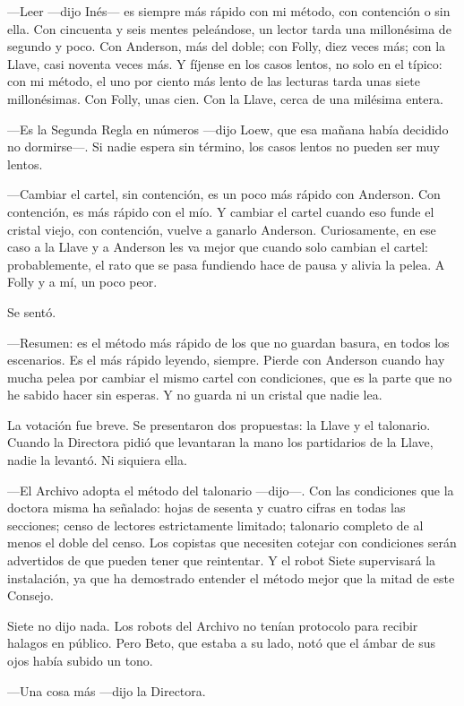 ---Leer ---dijo Inés--- es siempre más rápido con mi método, con contención o sin ella. Con cincuenta y seis mentes peleándose, un lector tarda una millonésima de segundo y poco. Con Anderson, más del doble; con Folly, diez veces más; con la Llave, casi noventa veces más. Y fíjense en los casos lentos, no solo en el típico: con mi método, el uno por ciento más lento de las lecturas tarda unas siete millonésimas. Con Folly, unas cien. Con la Llave, cerca de una milésima entera.

---Es la Segunda Regla en números ---dijo Loew, que esa mañana había decidido no dormirse---\nobreak. Si nadie espera sin término, los casos lentos no pueden ser muy lentos.

---Cambiar el cartel, sin contención, es un poco más rápido con Anderson. Con contención, es más rápido con el mío. Y cambiar el cartel cuando eso funde el cristal viejo, con contención, vuelve a ganarlo Anderson. Curiosamente, en ese caso a la Llave y a Anderson les va mejor que cuando solo cambian el cartel: probablemente, el rato que se pasa fundiendo hace de pausa y alivia la pelea. A Folly y a mí, un poco peor.

Se sentó.

---Resumen: es el método más rápido de los que no guardan basura, en todos los escenarios. Es el más rápido leyendo, siempre. Pierde con Anderson cuando hay mucha pelea por cambiar el mismo cartel con condiciones, que es la parte que no he sabido hacer sin esperas. Y no guarda ni un cristal que nadie lea.

\escena
La votación fue breve. Se presentaron dos propuestas: la Llave y el talonario. Cuando la Directora pidió que levantaran la mano los partidarios de la Llave, nadie la levantó. Ni siquiera ella.

---El Archivo adopta el método del talonario ---dijo---\nobreak. Con las condiciones que la doctora misma ha señalado: hojas de sesenta y cuatro cifras en todas las secciones; censo de lectores estrictamente limitado; talonario completo de al menos el doble del censo. Los copistas que necesiten cotejar con condiciones serán advertidos de que pueden tener que reintentar. Y el robot Siete supervisará la instalación, ya que ha demostrado entender el método mejor que la mitad de este Consejo.

Siete no dijo nada. Los robots del Archivo no tenían protocolo para recibir halagos en público. Pero Beto, que estaba a su lado, notó que el ámbar de sus ojos había subido un tono.

---Una cosa más ---dijo la Directora.

